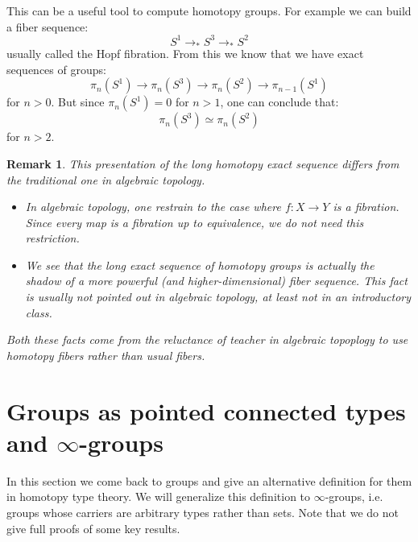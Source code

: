 \documentclass{article}
\newcommand{\se}[1]{\medbreak \medbreak \section{#1}}
\renewcommand{\r}{\rightarrow}
\newtheorem{definition}{Definition}
\newtheorem{remark}{Remark}
\begin{document}
This can be a useful tool to compute homotopy groups. For example we can build a fiber sequence: 
\[S^1\r_* S^3\r_*S^2\]
usually called the Hopf fibration. From this we know that we have exact sequences of groups:
\[\pi_n(S^1)\r \pi_n(S^3)\r \pi_n(S^2)\r \pi_{n-1}(S^1) \]
for $n> 0$. But since $\pi_n(S^1) = 0$ for $n>1$, one can conclude that:
\[\pi_n(S^3)\simeq \pi_n(S^2)\]
for $n>2$.

\begin{remark}
This presentation of the long homotopy exact sequence differs from the traditional one in algebraic topology.
\begin{itemize}
\item In algebraic topology, one restrain to the case where $f:X\r Y$ is a fibration. Since every map is a fibration up to equivalence, we do not need this restriction.
\item We see that the long exact sequence of homotopy groups is actually the shadow of a more powerful (and higher-dimensional) fiber sequence. This fact is usually not pointed out in algebraic topology, at least not in an introductory class.
\end{itemize}
Both these facts come from the reluctance of teacher in algebraic topoplogy to use homotopy fibers rather than usual fibers. %
\end{remark}









\se{Groups as pointed connected types and $\infty$-groups}

In this section we come back to groups and give an alternative definition for them in homotopy type theory. We will generalize this definition to $\infty$-groups, i.e. groups whose carriers are arbitrary types rather than sets. Note that we do not give full proofs of some key results.
\end{document}
